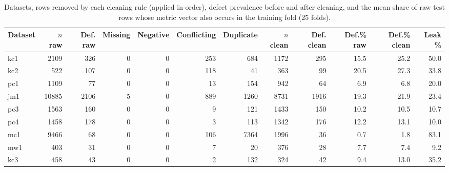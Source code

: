 \begin{table}[t]
\centering
\footnotesize
\caption{Datasets, rows removed by each cleaning rule (applied in order), defect prevalence before and after cleaning, and the mean share of raw test rows whose metric vector also occurs in the training fold (25 folds).}
\label{tab:data}
\begin{adjustbox}{max width=\linewidth}
\begin{tabular}{lrrrrrrrrrrr}
\toprule
Dataset & $n$ raw & Def. raw & Missing & Negative & Conflicting & Duplicate & $n$ clean & Def. clean & Def.\% raw & Def.\% clean & Leak \% \\
\midrule
kc1 & 2109 & 326 & 0 & 0 & 253 & 684 & 1172 & 295 & 15.5 & 25.2 & 50.0 \\
kc2 & 522 & 107 & 0 & 0 & 118 & 41 & 363 & 99 & 20.5 & 27.3 & 33.8 \\
pc1 & 1109 & 77 & 0 & 0 & 13 & 154 & 942 & 64 & 6.9 & 6.8 & 20.0 \\
jm1 & 10885 & 2106 & 5 & 0 & 889 & 1260 & 8731 & 1916 & 19.3 & 21.9 & 23.4 \\
pc3 & 1563 & 160 & 0 & 0 & 9 & 121 & 1433 & 150 & 10.2 & 10.5 & 10.7 \\
pc4 & 1458 & 178 & 0 & 0 & 3 & 113 & 1342 & 176 & 12.2 & 13.1 & 10.0 \\
mc1 & 9466 & 68 & 0 & 0 & 106 & 7364 & 1996 & 36 & 0.7 & 1.8 & 83.1 \\
mw1 & 403 & 31 & 0 & 0 & 7 & 20 & 376 & 28 & 7.7 & 7.4 & 9.2 \\
kc3 & 458 & 43 & 0 & 0 & 2 & 132 & 324 & 42 & 9.4 & 13.0 & 35.2 \\
\bottomrule
\end{tabular}
\end{adjustbox}
\end{table}

